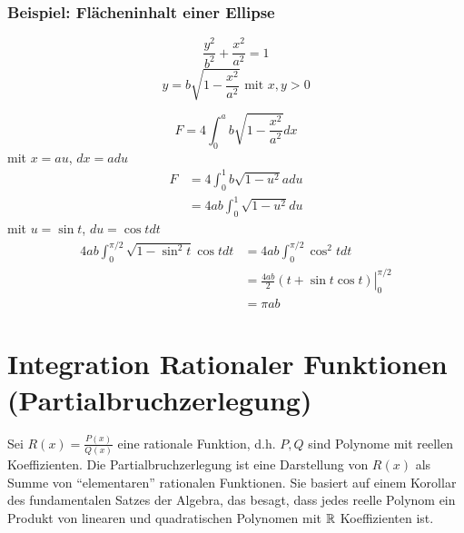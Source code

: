 \begin{enumerate}
\subsubsection*{Beispiel: Flächeninhalt einer Ellipse}

\begin{figure}[ht]
\begin{minipage}[b]{0.45\linewidth}
\centering
{}

\end{minipage}
\hspace{0.5cm}
\begin{minipage}[b]{0.45\linewidth}

\centering
\[\frac{y^2}{b^2}+\frac{x^2}{a^2}=1\]
\[y=b\sqrt{1-\frac{x^2}{a^2}}\text{ mit }x,y>0\]

\end{minipage}
\end{figure}
\[F=4\int ^{a}_{0}b\sqrt {1-\dfrac {x^{2}}{a^{2}}}dx\]
mit $x=au$, $dx=adu$
\begin{align*}
F&=4\int ^{1}_{0}b\sqrt {1-u^2}adu\\
&=4ab\int ^{1}_{0}\sqrt {1-u^2}du
\end{align*}
mit $u=\sin t$, $du=\cos tdt$
\begin{align*}
4ab\int ^{\pi /2}_{0}\sqrt {1-\sin^2t}\cos t dt &=4ab\int ^{\pi /2}_{0}\cos ^{2}tdt\\
&=\left.\frac{4ab}{2}\left( t+\sin t\cos t\right) \right| ^{\pi /2}_{0}\\
&=\pi ab
\end{align*}
\end{enumerate}



\section{Integration Rationaler Funktionen (Partialbruchzerlegung)}
Sei $R(x)=\frac{P(x)}{Q(x)}$ eine rationale Funktion, d.h. $P,Q$ sind Polynome mit reellen Koeffizienten. Die Partialbruchzerlegung ist eine Darstellung von $R(x)$ als Summe von ``elementaren'' rationalen Funktionen. Sie basiert auf einem Korollar des fundamentalen Satzes der Algebra, das besagt, dass jedes reelle Polynom ein Produkt von linearen und quadratischen Polynomen mit $\mathbb{R}$ Koeffizienten ist.

